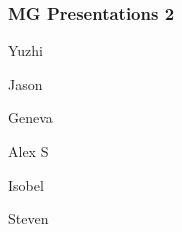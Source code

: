 \documentclass[t,12pt,numbers,fleqn]{beamer}
\begin{document}



\begin{frame}
\frametitle{MG Presentations 2}

\bi
\item Yuzhi
\item Jason
\item Geneva
\item Alex S
\item Isobel
\item Steven
\ei
\end{frame}

\end{document}
